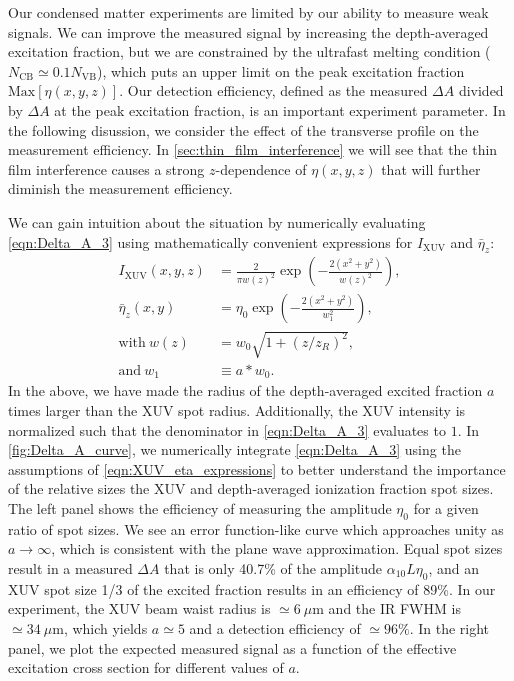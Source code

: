 Our condensed matter experiments are limited by our ability to measure weak signals. We can improve the measured signal by increasing the depth-averaged excitation fraction, but we are constrained by the ultrafast melting condition ($N_{\textrm{CB}} \simeq 0.1 N_{\textrm{VB}}$), which puts an upper limit on the peak excitation fraction $\textrm{Max}[\eta(x,y,z)]$. Our detection efficiency, defined as the measured $\Delta A$ divided by $\Delta A$ at the peak excitation fraction, is an important experiment parameter. In the following disussion, we consider the effect of the transverse profile on the measurement efficiency. In \cref{sec:thin_film_interference} we will see that the thin film interference causes a strong $z$-dependence of $\eta(x,y,z)$ that will further diminish the measurement efficiency.

We can gain intuition about the situation by numerically evaluating \cref{eqn:Delta_A_3} using mathematically convenient expressions for $I_{\textrm{XUV}}$ and $\bar{\eta}_z$:
\begin{equation}
\begin{aligned}
I_{\textrm{XUV}} (x,y,z) &= \frac{2}{\pi w(z)^2} \exp \left( - \frac{2 (x^2 + y^2)}{w(z)^2} \right), \\
\bar{\eta}_z(x,y) &= \eta_0 \exp \left( -\frac{2(x^2 + y^2)}{w_1^2} \right), \\
\textrm{with} \ w(z) &= w_0 \sqrt{1 + (z/z_R)^2}, \\
\textrm{and} \ w_1 &\equiv a*w_0.
\end{aligned}
\label{eqn:XUV_eta_expressions}
\end{equation}
In the above, we have made the radius of the depth-averaged excited fraction $a$ times larger than the XUV spot radius. Additionally, the XUV intensity is normalized such that the denominator in \cref{eqn:Delta_A_3} evaluates to $1$. In \cref{fig:Delta_A_curve}, we numerically integrate \cref{eqn:Delta_A_3} using the assumptions of \cref{eqn:XUV_eta_expressions} to better understand the importance of the relative sizes the XUV and depth-averaged ionization fraction spot sizes. The left panel shows the efficiency of measuring the amplitude $\eta_0$ for a given ratio of spot sizes. We see an error function-like curve which approaches unity as $a \rightarrow \infty$, which is consistent with the plane wave approximation. Equal spot sizes result in a measured $\Delta A$ that is only 40.7\% of the amplitude $\alpha_{10} L \eta_0$, and an XUV spot size 1/3 of the excited fraction results in an efficiency of 89\%. In our experiment, the XUV beam waist radius is $\simeq 6 \ \mu \textrm{m}$ and the IR FWHM is $\simeq 34 \ \mu \textrm{m}$, which yields $a \simeq 5$ and a detection efficiency of $\simeq 96\%$. In the right panel, we plot the expected measured signal as a function of the effective excitation cross section for different values of $a$.

